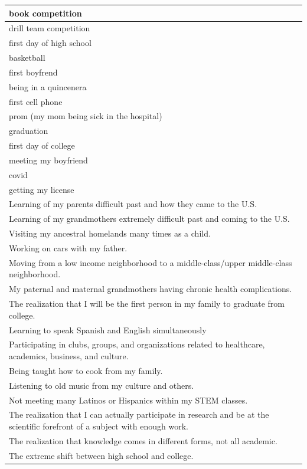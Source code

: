 \documentclass[
  .7em,
  letterpaper,
  DIV=11,
  numbers=noendperiod]{scrartcl}
\begin{document}
\begin{table}
\begin{tabular}{l}
\hline
book competition\\
\hline
drill team competition\\
\hline
first day of high school\\
\hline
basketball\\
\hline
first boyfrend\\
\hline
being in a quincenera\\
\hline
first cell phone\\
\hline
prom (my mom being sick in the hospital)\\
\hline
graduation\\
\hline
first day of college\\
\hline
meeting my boyfriend\\
\hline
covid\\
\hline
getting my license\\
\hline
Learning of my parents difficult past and how they came to the U.S.\\
\hline
Learning of my grandmothers extremely difficult past and coming to the U.S.\\
\hline
Visiting my ancestral homelands many times as a child.\\
\hline
Working on cars with my father.\\
\hline
Moving from a low income neighborhood to a middle-class/upper middle-class neighborhood.\\
\hline
My paternal and maternal grandmothers having chronic health complications.\\
\hline
The realization that I will be the first person in my family to graduate from college.\\
\hline
Learning to speak Spanish and English simultaneously\\
\hline
Participating in clubs, groups, and organizations related to healthcare, academics, business, and culture.\\
\hline
Being taught how to cook from my family.\\
\hline
Listening to old music from my culture and others.\\
\hline
Not meeting many Latinos or Hispanics within my STEM classes.\\
\hline
The realization that I can actually participate in research and be at the scientific forefront of a subject with enough work.\\
\hline
The realization that knowledge comes in different forms, not all academic.\\
\hline
The extreme shift between high school and college.\\

\end{tabular}
\end{table}
\end{document}
